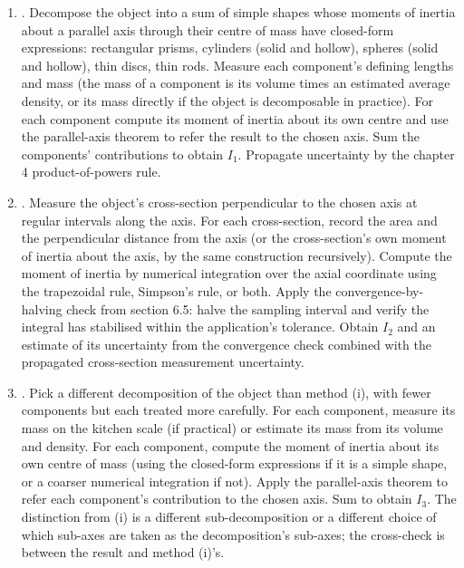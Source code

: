 \begin{project}
\begin{enumerate}[leftmargin=*]
  \item {}.
    Decompose the object into a sum of simple shapes whose moments
    of inertia about a parallel axis through their centre of mass
    have closed-form expressions: rectangular prisms, cylinders
    (solid and hollow), spheres (solid and hollow), thin discs,
    thin rods. Measure each component's defining lengths and mass
    (the mass of a component is its volume times an estimated
    average density, or its mass directly if the object is
    decomposable in practice). For each component compute its
    moment of inertia about its own centre and use the
    parallel-axis theorem to refer the result to the chosen axis.
    Sum the components' contributions to obtain $I_{1}$. Propagate
    uncertainty by the chapter 4 product-of-powers rule.
  \item {}. Measure the object's cross-section perpendicular to
    the chosen axis at regular intervals along the axis. For each
    cross-section, record the area and the perpendicular distance
    from the axis (or the cross-section's own moment of inertia
    about the axis, by the same construction recursively). Compute
    the moment of inertia by numerical integration over the axial
    coordinate using the trapezoidal rule, Simpson's rule, or both.
    Apply the convergence-by-halving check from section 6.5: halve
    the sampling interval and verify the integral has stabilised
    within the application's tolerance. Obtain $I_{2}$ and an
    estimate of its uncertainty from the convergence check
    combined with the propagated cross-section measurement
    uncertainty.
  \item {}. Pick a
    different decomposition of the object than method (i), with
    fewer components but each treated more carefully. For each
    component, measure its mass on the kitchen scale (if
    practical) or estimate its mass from its volume and density.
    For each component, compute the moment of inertia about its
    own centre of mass (using the closed-form expressions if it is
    a simple shape, or a coarser numerical integration if not).
    Apply the parallel-axis theorem to refer each component's
    contribution to the chosen axis. Sum to obtain $I_{3}$. The
    distinction from (i) is a different sub-decomposition or a
    different choice of which sub-axes are taken as the
    decomposition's sub-axes; the cross-check is between the
    result and method (i)'s.
\end{enumerate}


\end{project}
